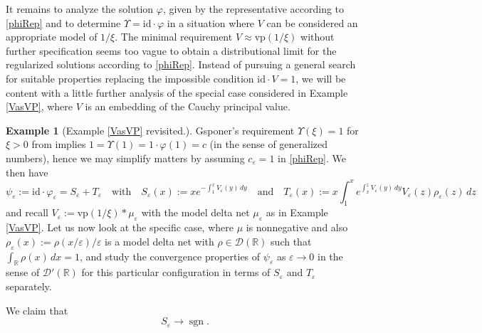 \documentclass[sumlimits,intlimits,namelimits%
]{amsart}
\newcommand{\D}{\ensuremath{\mathcal{D}}}
\newcommand{\mb}[1]{\ensuremath{\mathbb{#1}}}
\newcommand{\R}{\mb{R}}
\newcommand{\vp}{\mathrm{vp}}
\newcommand{\sgn}{\mathop{\mathrm{sgn}}}
\theoremstyle{definition}
\newtheorem{example}[theorem]{Example}
\newcommand{\beq}{\begin{equation}}
\newcommand{\eeq}{\end{equation}}
\newcommand{\eps}{\varepsilon}
\newcommand{\vphi}{\varphi}
\begin{document}
It remains to analyze the solution $\vphi$, given by the representative according to \eqref{phiRep} and to determine $\Upsilon = \mathrm{id} \cdot \vphi$ in a situation where $V$ can be considered an appropriate model of $1/\xi$. The minimal requirement  $V \approx \vp(1/\xi)$ without further specification seems too vague to obtain a distributional limit for the regularized solutions according to \eqref{phiRep}. Instead of pursuing a general search for suitable properties replacing the impossible condition $\mathrm{id} \cdot V = 1$, we will be content with a little further analysis of the special case considered in Example \ref{VasVP}, where $V$ is an embedding of the Cauchy principal value.

\begin{example}[Example \ref{VasVP} revisited.] Gsponer's requirement $\Upsilon(\xi) = 1$ for $\xi > 0$ from \cite{GEW,GPOT} implies $1 = \Upsilon(1) = 1 \cdot \vphi(1) = c$ (in the sense of generalized numbers), hence we may simplify matters by assuming $c_\eps = 1$ in \eqref{phiRep}. We then have
$$
   \psi_\eps := \mathrm{id} \cdot \vphi_\eps = S_\eps + T_\eps \quad\text{with}\quad 
       S_\eps(x) := x e^{- \int_1^x V_\eps(y) \, dy} \quad\text{and}\quad
       T_\eps(x) := x \int_1^x e^{\int_x^z V_\eps(y) \,dy} V_\eps(z) \rho_\eps(z)\, dz
$$
and recall  $V_\eps := \vp(1/\xi) * \mu_\eps$ with the model delta net $\mu_\eps$ as in Example \ref{VasVP}. Let us now look at the specific case, where $\mu$ is nonnegative and also $\rho_\eps(x) := \rho(x/\eps)/\eps$ is a model delta net with $\rho \in \D(\R)$ such that $\int_\R \rho(x) \, dx = 1$, and study the convergence properties of $\psi_\eps$ as $\eps \to 0$  in the sense of $\D'(\R)$ for this particular configuration in terms of $S_\eps$ and $T_\eps$ separately.

We claim that
\beq\label{Claima}
   S_\eps \to \sgn. 
\eeq


\end{example}
\end{document}
